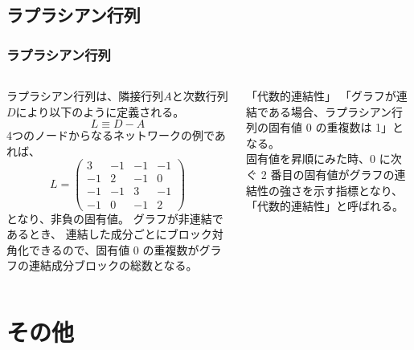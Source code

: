 \documentclass[12pt, dvipdfmx]{beamer}
\begin{document}
\subsection{ラプラシアン行列}
\begin{frame}
	\frametitle{ラプラシアン行列}
		\begin{columns}[totalwidth=1\textwidth]
				ラプラシアン行列は、隣接行列$A$と次数行列$D$により以下のように定義される。
				$$
				L \equiv D-A
				$$
				4つのノードからなるネットワークの例であれば、
				$$
				L = \left( 
				\begin{array}{cccc} 
				3 & -1 & -1 & -1 \\ 
				-1 &  2 & -1 & 0 \\
				-1 & -1 &  3 & -1 \\
				-1 &  0 & -1 & 2 
				\end{array} 
				\right) 
				$$
				となり、非負の固有値。
				グラフが非連結であるとき、%
				連結した成分ごとにブロック対角化できるので、固有値 0 の重複数がグラフの連結成分ブロックの総数となる。
				\begin{block}{「代数的連結性」}
					「グラフが連結である場合、ラプラシアン行列の固有値 0 の重複数は 1」となる。\\
					固有値を昇順にみた時、0 に次ぐ 2 番目の固有値がグラフの連結性の強さを示す指標となり、「代数的連結性」と呼ばれる。
				\end{block}
		\end{columns}
\end{frame}


\section{その他}

\end{document}
